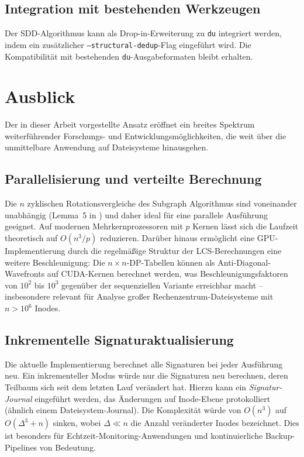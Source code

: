 ﻿\documentclass[a4paper,12pt]{article}
\theoremstyle{definition}
\begin{document}
\subsection{Integration mit bestehenden Werkzeugen}

Der SDD-Algorithmus kann als Drop-in-Erweiterung zu \texttt{du} integriert
werden, indem ein zus\"atzlicher \texttt{--structural-dedup}-Flag eingef\"uhrt
wird. Die Kompatibilit\"at mit bestehenden \texttt{du}-Ausgabeformaten bleibt
erhalten.

\section{Ausblick}

Der in dieser Arbeit vorgestellte Ansatz er\"offnet ein breites Spektrum
weiterf\"uhrender Forschungs- und Entwicklungsm\"oglichkeiten, die weit
\"uber die unmittelbare Anwendung auf Dateisysteme hinausgehen.

\subsection{Parallelisierung und verteilte Berechnung}

Die $n$ zyklischen Rotationsvergleiche des Subgraph Algorithmus sind
voneinander unabh\"angig (Lemma~5 in \cite{epp2026subgraph}) und daher
ideal f\"ur eine parallele Ausf\"uhrung geeignet. Auf modernen
Mehrkernprozessoren mit $p$ Kernen l\"asst sich die Laufzeit theoretisch
auf $O(n^3 / p)$ reduzieren. Dar\"uber hinaus erm\"oglicht eine
GPU-Implementierung durch die regelm\"a\ss{}ige Struktur der
LCS-Berechnungen eine weitere Beschleunigung: Die $n \times n$-DP-Tabellen
k\"onnen als Anti-Diagonal-Wavefronts auf CUDA-Kernen berechnet werden,
was Beschleunigungsfaktoren von $10^2$ bis $10^3$ gegen\"uber der
sequenziellen Variante erreichbar macht -- insbesondere relevant f\"ur
Analyse gro\ss{}er Rechenzentrum-Dateisysteme mit $n > 10^6$ Inodes.

\subsection{Inkrementelle Signaturaktualisierung}

Die aktuelle Implementierung berechnet alle Signaturen bei jeder Ausf\"uhrung
neu. Ein inkrementeller Modus w\"urde nur die Signaturen neu berechnen,
deren Teilbaum sich seit dem letzten Lauf ver\"andert hat. Hierzu kann ein
\emph{Signatur-Journal} eingef\"uhrt werden, das \"Anderungen auf
Inode-Ebene protokolliert (\"ahnlich einem Dateisystem-Journal). Die
Komplexit\"at w\"urde von $O(n^3)$ auf $O(\Delta^3 + n)$ sinken, wobei
$\Delta \ll n$ die Anzahl ver\"anderter Inodes bezeichnet. Dies ist
besonders f\"ur Echtzeit-Monitoring-Anwendungen und kontinuierliche
Backup-Pipelines von Bedeutung.
\end{document}
